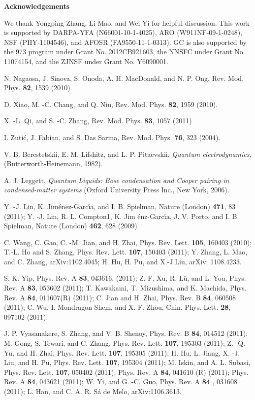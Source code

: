 \documentclass[pra,print,showpacs,superscriptaddress,twocolumn]{revtex4}
\begin{document}
\textbf{Acknowledgements}

We thank Yongping Zhang, Li Mao, and Wei Yi for helpful discussion. This
work is supported by DARPA-YFA (N66001-10-1-4025), ARO (W911NF-09-1-0248),
NSF (PHY-1104546), and AFOSR (FA9550-11-1-0313). GC is also supported by the
973 program under Grant No. 2012CB921603, the NNSFC under Grant No.
11074154, and the ZJNSF under Grant No. Y6090001.

\begin{thebibliography}{99}
 N. Nagaosa, J. Sinova, S. Onoda, A. H. MacDonald, and N. P.
Ong, Rev. Mod. Phys. \textbf{82}, 1539 (2010).

 D. Xiao, M. -C. Chang, and Q. Niu, Rev. Mod. Phys. \textbf{82},
1959 (2010).

 X. -L. Qi, and S. -C. Zhang, Rev. Mod. Phys. \textbf{83}, 1057
(2011)

 I. \u{Z}uti\'{c}, J. Fabian, and S. Das Sarma, Rev. Mod.
Phys. \textbf{76}, 323 (2004).

 V. B. Berestetskii, E. M. Lifshitz, and L. P. Pitaevskii,
\textit{Quantum electrodynamics}, (Butterworth-Heinemann, 1982).

 A. J. Leggett, \textit{Quantum Liquids: Bose condensation
and Cooper pairing in condensed-matter systems} (Oxford University Press
Inc., New York, 2006).

 Y. -J. Lin, K. Jim\'{e}nez-Garc\'{\i}a, and I. B. Spielman,
Nature (London) \textbf{471}, 83 (2011); Y. -J. Lin, R. L. Compton1, K. Jim%
\'{e}nz-Garc\'{\i}a, J. V. Porto, and I. B. Spielman, Nature (London)
\textbf{462}, 628 (2009).

 C. Wang, C. Gao, C. -M. Jian, and H. Zhai, Phys. Rev. Lett.
\textbf{105}, 160403 (2010); T.-L. Ho and S. Zhang, Phys. Rev. Lett. \textbf{%
107}, 150403 (2011); Y. Zhang, L. Mao, and C. Zhang, arXiv:1102.4045; H. Hu,
H. Pu, and X.-J.Liu, arXiv: 1108.4233.

 S. K. Yip, Phys. Rev. A \textbf{83}, 043616, (2011); Z. F.
Xu, R. L\"{u}, and L. You, Phys. Rev. A \textbf{83}, 053602 (2011); T.
Kawakami, T. Mizushima, and K. Machida, Phys. Rev. A \textbf{84}, 011607(R)
(2011); C. Jian and H. Zhai, Phys. Rev. B \textbf{84}, 060508 (2011); C. Wu,
I. Mondragon-Shem, and X.-F. Zhou, Chin. Phys. Lett. \textbf{28}, 097102
(2011).

 J. P. Vyasanakere, S. Zhang, and V. B. Shenoy, Phys. Rev. B
\textbf{84}, 014512 (2011); M. Gong, S. Tewari, and C. Zhang, Phys.
Rev. Lett. \textbf{107}, 195303 (2011); Z. -Q. Yu, and H. Zhai,
Phys. Rev. Lett. \textbf{107}, 195305 (2011); H. Hu, L. Jiang, X.
-J. Liu, and H. Pu, Phys. Rev. Lett. \textbf{107}, 195304 (2011); M.
Iskin, and A. L. Subasi, Phys. Rev. Lett. \textbf{107}, 050402
(2011); Phys. Rev. A \textbf{84}, 041610 (R) (2011); Phys. Rev.
A \textbf{84}, 043621 (2011); W. Yi, and G. -C. Guo, Phys. Rev. A \textbf{84}%
, 031608 (2011); L. Han, and C. A. R. S\'{a} de Melo, arXiv:1106.3613.


\end{thebibliography}
\end{document}
